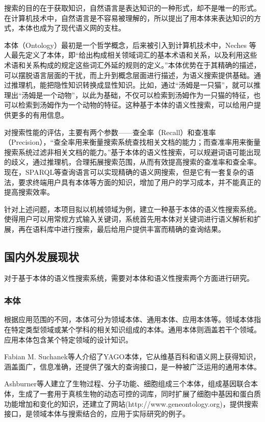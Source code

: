 \documentclass[12pt,a4paper]{article}
\begin{document}
	搜索的目的在于获取知识，自然语言是表达知识的一种形式，却不是唯一的形式。在计算机技术中，自然语言是不容易被理解的，所以提出了用本体来表达知识的方式，本体也成为了现代语义网的支柱。
   
	本体（{\Times Ontology}）最初是一个哲学概念，后来被引入到计算机技术中，{\Times Neches} 等人最先定义了本体，即“给出构成相关领域词汇的基本术语和关系，以及利用这些术语和关系构成的规定这些词汇外延的规则的定义。”\cite{3}本体优势在于其精确的描述，可以摆脱语言层面的干扰，而上升到概念层面进行描述，为语义搜索提供基础。通过推理机，能把隐性知识转换成显性知识。比如，通过“汤姆是一只猫”，就可以推理出“汤姆是一个动物”，以此为基础，不仅可以检索到汤姆作为一只猫的特征，也可以检索到汤姆作为一个动物的特征。这种基于本体的语义性搜索，可以给用户提供更多的有用信息。
   
	对搜索性能的评估，主要有两个参数——查全率（{\Times Recall}）和查准率（{\Times Precision}），“查全率用来衡量搜索系统查找相关文档的能力；而查准率用来衡量搜索系统过滤非相关文档的能力。”\cite{4}基于本体的语义性搜索，可以规避词语可能出现的歧义，通过推理机，合理拓展搜索范围，从而有效提高搜索的查准率和查全率。现在，{\Times SPARQL}等查询语言可以实现精确的语义网搜索，但是它有一套复杂的语法，要求终端用户具有本体等方面的知识，增加了用户的学习成本，并不能真正的提高搜索效率。

	针对上述问题，本项目拟以机械领域为例，建立一种基于本体的语义性搜索系统。使得用户可以用常规方式输入关键词，系统首先用本体对关键词进行语义解析和扩展，再在语料库中进行搜索，最后给用户提供丰富而精确的查询结果。
	\subsection{国内外发展现状}
	对于基于本体的语义性搜索系统，需要对本体和语义性搜索两个方面进行研究。
		\subsubsection*{本体}
	根据应用范围的不同，本体可分为领域本体、通用本体、应用本体等。领域本体指在特定类型领域或某个学科的相关知识组成的本体。通用本体则涵盖若干个领域。应用本体包含某个特定领域的设计知识。
	
	{\Times Fabian M. Suchanek}等人介绍了{\Times YAGO}本体，它从维基百科和语义网上获得知识，涵盖面广，信息准确，还提供了强大的查询接口，是一种被广泛运用的通用本体\cite{5}。
	
	{\Times Ashburner}等人建立了生物过程、分子功能、细胞组成三个本体，组成基因联合本体，生成了一套用于真核生物的动态可控的词库，同时扩展了细胞中基因和蛋白质功能增加和变化的知识，还建立了网站({\Times http://www.geneontology.org})，提供搜索接口\cite{6}，是领域本体与搜索结合的，应用于实际研究的例子。
	
\end{document}
